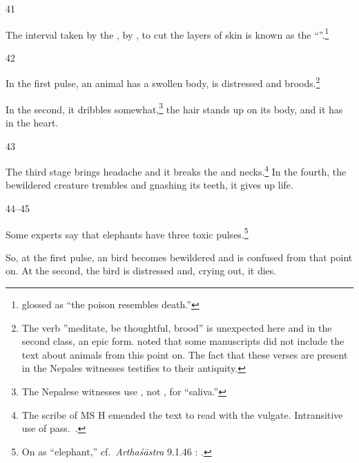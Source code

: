 \begin{translation}
\item[41]
\begin{sloka}
The interval taken by the ,  by , to cut the layers of 
    skin is
known as the “”.\footnote{ glossed  as
     “the poison resembles death.”}
\end{sloka}


\item[42]

\begin{sloka}
    In the first pulse, an animal has a swollen body, is distressed and
broods.\footnote{The verb \root{} ”meditate, be
    thoughtful, brood” is unexpected here and in the  second class, an
    epic form.  noted that some manuscripts did not
    include the text about animals from this point on.  The fact that
    these verses are present in the Nepales witnesses testifies to their
    antiquity.}
    
    In the second, it dribbles somewhat,\footnote{The Nepalese witnesses use 
    , not , for “saliva.”} the hair stands up on its 
        body, and it has  in the heart.
\end{sloka}


\item[43]

\begin{sloka}
    
    The third stage brings headache and it breaks the  and
necks.\footnote{The scribe of MS H emended the text to read
     with the vulgate.  Intransitive use of pass.\
    .}  In the fourth, the bewildered creature trembles and gnashing 
    its teeth, it gives up life.
    
\end{sloka}

\item[44--45]
\begin{sloka}
    Some experts say that elephants have three toxic pulses\sse{vega}{toxic 
    pulse}.\footnote{On \dev{antaḥsveda} as “elephant,” cf.\
\emph{Arthaśāstra}
    9.1.46 \parencites[v.\,1, 219]{kang-1969}[351]{oliv-2013}: .}
  
    
    So, at the first pulse, an bird becomes bewildered and is confused
from that point on.  At the second, the bird is distressed and,
crying out, it dies.


\end{sloka}
\end{translation}
